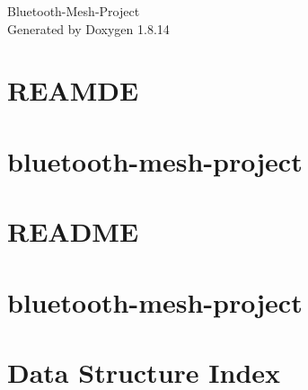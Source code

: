 \documentclass[twoside]{book}
\newcommand{\+}{\discretionary{\mbox{\scriptsize$\hookleftarrow$}}{}{}}
\newcommand{\clearemptydoublepage}{%
  \newpage{\pagestyle{empty}\cleardoublepage}%
}
\begin{document}
\hypersetup{pageanchor=false,
             bookmarksnumbered=true,
             pdfencoding=unicode
            }
\begin{titlepage}
\vspace*{7cm}
\begin{center}%
{\Large Bluetooth-\/\+Mesh-\/\+Project }\\
\vspace*{1cm}
{\large Generated by Doxygen 1.8.14}\\
\end{center}
\end{titlepage}
\clearemptydoublepage
{}
\tableofcontents
\clearemptydoublepage
{}
\hypersetup{pageanchor=true}

\chapter{R\+E\+A\+M\+DE}
\label{md__c_1__git_hub_repo_bluetooth-mesh-project_piconet__r_e_a_m_d_e}

\chapter{bluetooth-\/mesh-\/project}
\label{md__c_1__git_hub_repo_bluetooth-mesh-project__r_e_a_d_m_e}

\chapter{R\+E\+A\+D\+ME}
\label{md__c_1__git_hub_repo_bluetooth-mesh-project_scan__r_e_a_d_m_e}

\chapter{bluetooth-\/mesh-\/project}
\label{md__c_1__git_hub_repo_bluetooth-mesh-project_tcpserver__r_e_a_d_m_e}

\chapter{Data Structure Index}

\end{document}
